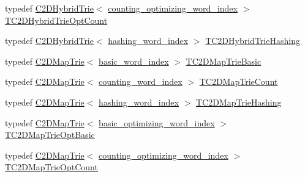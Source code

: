 \begin{DoxyCompactItemize}
\item 
typedef \hyperlink{classuva_1_1smt_1_1bpbd_1_1server_1_1lm_1_1_c2_d_hybrid_trie}{C2\+D\+Hybrid\+Trie}$<$ \hyperlink{namespaceuva_1_1smt_1_1bpbd_1_1server_1_1lm_1_1dictionary_a61cbd647b15de785ccf4cdd26661c366}{counting\+\_\+optimizing\+\_\+word\+\_\+index} $>$ \hyperlink{namespaceuva_1_1smt_1_1bpbd_1_1server_1_1lm_a4bdbd74a65273103a73e6d6ffca9cc17}{T\+C2\+D\+Hybrid\+Trie\+Opt\+Count}
\item 
typedef \hyperlink{classuva_1_1smt_1_1bpbd_1_1server_1_1lm_1_1_c2_d_hybrid_trie}{C2\+D\+Hybrid\+Trie}$<$ \hyperlink{classuva_1_1smt_1_1bpbd_1_1server_1_1lm_1_1dictionary_1_1hashing__word__index}{hashing\+\_\+word\+\_\+index} $>$ \hyperlink{namespaceuva_1_1smt_1_1bpbd_1_1server_1_1lm_ac2bdab4ce215be43afe07de8390077e3}{T\+C2\+D\+Hybrid\+Trie\+Hashing}
\item 
typedef \hyperlink{classuva_1_1smt_1_1bpbd_1_1server_1_1lm_1_1_c2_d_map_trie}{C2\+D\+Map\+Trie}$<$ \hyperlink{classuva_1_1smt_1_1bpbd_1_1server_1_1lm_1_1dictionary_1_1basic__word__index}{basic\+\_\+word\+\_\+index} $>$ \hyperlink{namespaceuva_1_1smt_1_1bpbd_1_1server_1_1lm_a8665d6a6541f00def10ad17f7afb70db}{T\+C2\+D\+Map\+Trie\+Basic}
\item 
typedef \hyperlink{classuva_1_1smt_1_1bpbd_1_1server_1_1lm_1_1_c2_d_map_trie}{C2\+D\+Map\+Trie}$<$ \hyperlink{classuva_1_1smt_1_1bpbd_1_1server_1_1lm_1_1dictionary_1_1counting__word__index}{counting\+\_\+word\+\_\+index} $>$ \hyperlink{namespaceuva_1_1smt_1_1bpbd_1_1server_1_1lm_a56d9208d73838d355ee00f89b63dc2eb}{T\+C2\+D\+Map\+Trie\+Count}
\item 
typedef \hyperlink{classuva_1_1smt_1_1bpbd_1_1server_1_1lm_1_1_c2_d_map_trie}{C2\+D\+Map\+Trie}$<$ \hyperlink{classuva_1_1smt_1_1bpbd_1_1server_1_1lm_1_1dictionary_1_1hashing__word__index}{hashing\+\_\+word\+\_\+index} $>$ \hyperlink{namespaceuva_1_1smt_1_1bpbd_1_1server_1_1lm_a12fccfd31806fb43e8a74e287d49a464}{T\+C2\+D\+Map\+Trie\+Hashing}
\item 
typedef \hyperlink{classuva_1_1smt_1_1bpbd_1_1server_1_1lm_1_1_c2_d_map_trie}{C2\+D\+Map\+Trie}$<$ \hyperlink{namespaceuva_1_1smt_1_1bpbd_1_1server_1_1lm_1_1dictionary_a3001583c904eec702b4a4125082a7ecd}{basic\+\_\+optimizing\+\_\+word\+\_\+index} $>$ \hyperlink{namespaceuva_1_1smt_1_1bpbd_1_1server_1_1lm_a09b86a457aa219fca926fa7dd53f87d4}{T\+C2\+D\+Map\+Trie\+Opt\+Basic}
\item 
typedef \hyperlink{classuva_1_1smt_1_1bpbd_1_1server_1_1lm_1_1_c2_d_map_trie}{C2\+D\+Map\+Trie}$<$ \hyperlink{namespaceuva_1_1smt_1_1bpbd_1_1server_1_1lm_1_1dictionary_a61cbd647b15de785ccf4cdd26661c366}{counting\+\_\+optimizing\+\_\+word\+\_\+index} $>$ \hyperlink{namespaceuva_1_1smt_1_1bpbd_1_1server_1_1lm_ad514648b30bf36a97eb149f369a28c0c}{T\+C2\+D\+Map\+Trie\+Opt\+Count}

\end{DoxyCompactItemize}
